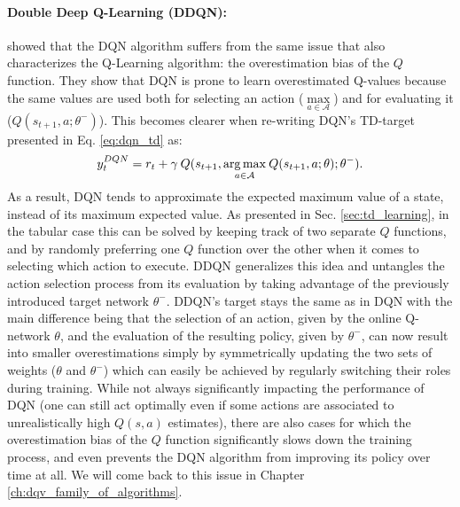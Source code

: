 \paragraph{Double Deep Q-Learning (DDQN):} \citet{van2016deep} showed that the DQN algorithm suffers from the same issue that also characterizes the Q-Learning algorithm: the overestimation bias of the $Q$ function. They show that DQN is prone to learn overestimated Q-values because the same values are used both for selecting an action ($\underset{a\in \mathcal{A}}{\max}$) and for evaluating it ($Q(s_{t+1},a;\theta^{-})$). This becomes clearer when re-writing DQN's TD-target presented in Eq. \ref{eq:dqn_td} as:
\begin{equation}
    y^{DQN}_{t} = r_{t} + \gamma \: Q(s_{t+1}, \underset{a\in \mathcal{A}}{\operatorname*{arg\,max}}\: Q(s_{t+1}, a; \theta); \theta^{-}).
\end{equation}{}
As a result, DQN tends to approximate the expected maximum value of a state, instead of its maximum expected value. As presented in Sec. \ref{sec:td_learning}, in the tabular case this can be solved by keeping track of two separate $Q$ functions, and by randomly preferring one $Q$ function over the other when it comes to selecting which action to execute. DDQN generalizes this idea and untangles the action selection process from its evaluation by taking advantage of the previously introduced target network $\theta^{-}$. DDQN's target stays the same as in DQN with the main difference being that the selection of an action, given by the online Q-network $\theta$, and the evaluation of the resulting policy, given by $\theta^{-}$, can now result into smaller overestimations simply by symmetrically updating the two sets of weights ($\theta$ and $\theta^{-}$) which can easily be achieved by regularly switching their roles during training. While not always significantly impacting the performance of DQN (one can still act optimally even if some actions are associated to unrealistically high $Q(s,a)$ estimates), there are also cases for which the overestimation bias of the $Q$ function significantly slows down the training process, and even prevents the DQN algorithm from improving its policy over time at all. We will come back to this issue in Chapter \ref{ch:dqv_family_of_algorithms}. 



